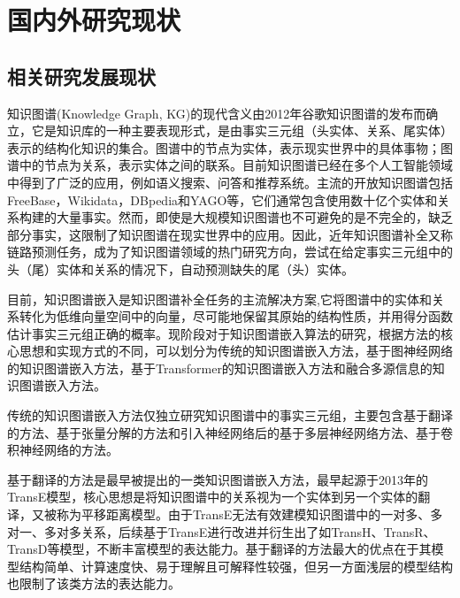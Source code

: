 \section{国内外研究现状}

\subsection{相关研究发展现状}
知识图谱(Knowledge Graph, KG)的现代含义由2012年谷歌知识图谱的发布而确立，它是知识库的一种主要表现形式，是由事实三元组（头实体、关系、尾实体）表示的结构化知识的集合。图谱中的节点为实体，表示现实世界中的具体事物；图谱中的节点为关系，表示实体之间的联系。目前知识图谱已经在多个人工智能领域中得到了广泛的应用，例如语义搜索、问答和推荐系统。主流的开放知识图谱包括FreeBase，Wikidata，DBpedia和YAGO等，它们通常包含使用数十亿个实体和关系构建的大量事实。然而，即使是大规模知识图谱也不可避免的是不完全的，缺乏部分事实，这限制了知识图谱在现实世界中的应用。因此，近年知识图谱补全又称链路预测任务，成为了知识图谱领域的热门研究方向，尝试在给定事实三元组中的头（尾）实体和关系的情况下，自动预测缺失的尾（头）实体。

目前，知识图谱嵌入是知识图谱补全任务的主流解决方案,它将图谱中的实体和关系转化为低维向量空间中的向量，尽可能地保留其原始的结构性质，并用得分函数估计事实三元组正确的概率。现阶段对于知识图谱嵌入算法的研究，根据方法的核心思想和实现方式的不同，可以划分为传统的知识图谱嵌入方法，基于图神经网络的知识图谱嵌入方法，基于Transformer的知识图谱嵌入方法和融合多源信息的知识图谱嵌入方法。

传统的知识图谱嵌入方法仅独立研究知识图谱中的事实三元组，主要包含基于翻译的方法、基于张量分解的方法和引入神经网络后的基于多层神经网络方法、基于卷积神经网络的方法。

基于翻译的方法是最早被提出的一类知识图谱嵌入方法，最早起源于2013年的TransE模型，核心思想是将知识图谱中的关系视为一个实体到另一个实体的翻译，又被称为平移距离模型。由于TransE无法有效建模知识图谱中的一对多、多对一、多对多关系，后续基于TransE进行改进并衍生出了如TransH、TransR、TransD等模型，不断丰富模型的表达能力。基于翻译的方法最大的优点在于其模型结构简单、计算速度快、易于理解且可解释性较强，但另一方面浅层的模型结构也限制了该类方法的表达能力。

